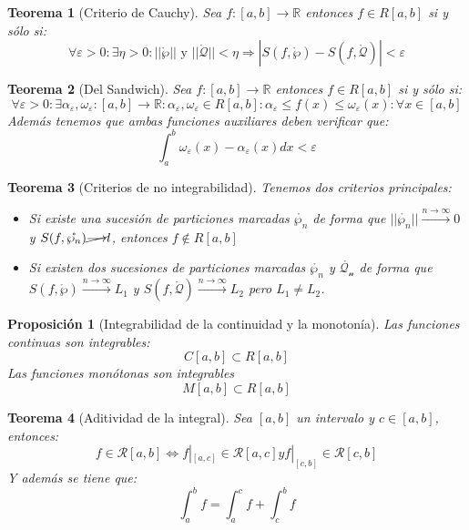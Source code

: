 \documentclass[10pt,a4paper,openright]{book}
\newtheorem{teorema}{Teorema}[chapter]
\newtheorem{proposicion}{Proposición}[chapter]
\begin{document}
\begin{teorema}[Criterio de Cauchy]
Sea $f:[a,b]\rightarrow \mathbb R$ entonces $f\in R[a,b]$ si y sólo si:
$$\forall \varepsilon > 0: \exists \eta > 0 : ||\mathring{\wp}|| \mbox{ y } ||\mathring{\mathcal{Q}}|| < \eta \Rightarrow \left| S(f,\mathring{\wp})- S(f, \mathring{\mathcal{Q}})\right| < \varepsilon $$
\end{teorema}

\begin{teorema}[Del Sandwich]
Sea $f:[a,b]\rightarrow \mathbb R$ entonces $f\in R[a,b]$ si y sólo si:
$$\forall \varepsilon >0 : \exists \alpha_\varepsilon, \omega_\varepsilon: [a,b]\rightarrow \mathbb R : \alpha_\varepsilon, \omega_\varepsilon \in R[a,b]: \alpha_\varepsilon \leq f(x)\leq \omega_\varepsilon (x): \forall x\in [a,b]$$
Además tenemos que ambas funciones auxiliares deben verificar que:
$$\int_{a}^{b} \omega_\varepsilon(x)-\alpha_\varepsilon(x) dx < \varepsilon$$
\end{teorema}

\begin{teorema}[Criterios de no integrabilidad]
Tenemos dos criterios principales:
\begin{itemize}
\item Si existe una sucesión de particiones marcadas $\mathring{\wp_n}$ de forma que $||\mathring{\wp_n}||\xrightarrow{n\rightarrow \infty} 0 $ y $S(f,\mathring{\wp_n})\cancel{\longrightarrow} l$, entonces $f\notin R[a,b]$

\item Si existen dos sucesiones de particiones marcadas $\mathring{\wp_n}$ y $\mathring{\mathcal{Q_n}}$ de forma que $S(f,\mathring{\wp})\xrightarrow{n\rightarrow \infty} L_1$ y $S(f,\mathring{\mathcal{Q}})\xrightarrow{n\rightarrow \infty} L_2$ pero $L_1\neq L_2$.
\end{itemize}
\end{teorema}

\begin{proposicion}[Integrabilidad de la continuidad y la monotonía]
Las funciones continuas son integrables:
$$C[a,b]\subset R[a,b]$$
Las funciones monótonas son integrables
$$M[a,b]\subset R[a,b]$$
\end{proposicion}

\begin{teorema}[Aditividad de la integral]
Sea $[a,b]$ un intervalo y $c\in [a,b]$, entonces:
$$f \in \mathcal{R}[a,b]\Leftrightarrow f|_{[a,c]} \in \mathcal{R} [a,c] y f|_{[c,b]} \in \mathcal{R} [c,b]$$
Y además se tiene que:
$$\int_{a}^{b} f = \int_{a}^{c} f + \int_{c}^{b} f$$
\end{teorema}
\end{document}
